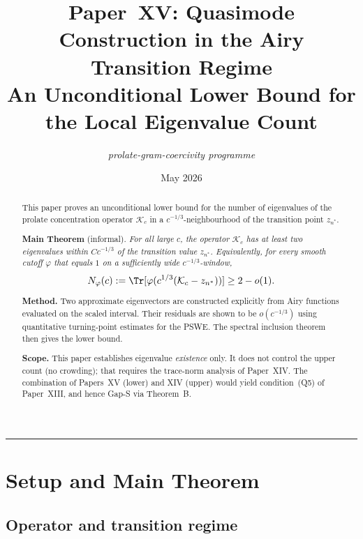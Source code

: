 \documentclass[12pt,a4paper]{amsart}
\theoremstyle{definition}
\newcommand{\Kc}{\mathcal{K}_c}
\begin{document}
\title[Paper XV: Quasimode Construction]{%
  Paper~XV: Quasimode Construction in the Airy Transition Regime\\[0.3em]
  \large An Unconditional Lower Bound for the Local Eigenvalue Count}

\author{\textit{prolate-gram-coercivity programme}}
\date{May 2026}

\begin{abstract}
This paper proves an unconditional lower bound for the number of
eigenvalues of the prolate concentration operator $\Kc$ in a
$c^{-1/3}$-neighbourhood of the transition point $z_{n^*}$.

\medskip\noindent
\textbf{Main Theorem} (informal).
\textit{For all large $c$, the operator $\Kc$ has at least two
eigenvalues within $C c^{-1/3}$ of the transition value $z_{n^*}$.
Equivalently, for every smooth cutoff $\varphi$ that equals $1$ on
a sufficiently wide $c^{-1/3}$-window,
\begin{equation*}
  N_\varphi(c) := \Tr[\varphi(c^{1/3}(\Kc - z_{n^*}))] \geq 2 - o(1).
\end{equation*}}

\medskip\noindent
\textbf{Method.}
Two approximate eigenvectors are constructed explicitly from
Airy functions evaluated on the scaled interval.
Their residuals are shown to be $o(c^{-1/3})$ using
quantitative turning-point estimates for the PSWE.
The spectral inclusion theorem then gives the lower bound.

\medskip\noindent
\textbf{Scope.}
This paper establishes eigenvalue \emph{existence} only.
It does not control the upper count (no crowding);
that requires the trace-norm analysis of Paper~XIV.
The combination of Papers~XV (lower) and XIV (upper) would
yield condition~(Q5) of Paper~XIII, and hence Gap-S via Theorem~B.
\end{abstract}

\maketitle
\tableofcontents
\bigskip\hrule\bigskip

\section{Setup and Main Theorem}
\label{sec:setup}

\subsection{Operator and transition regime}
\end{document}
